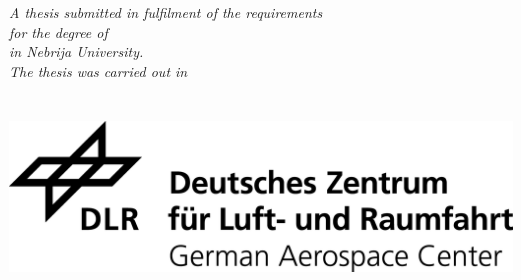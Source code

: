 \documentclass[
11pt, %
english, %
singlespacing, %
headsepline, %
]{MastersDoctoralThesis} %
\theoremstyle{definition}
\theoremstyle{remark}
\theoremstyle{theorem}
\theoremstyle{corollary}
\begin{document}
\begin{titlepage}
\begin{center}
\vfill

\large \textit{A thesis submitted in fulfilment of the requirements \\ for the degree of \degreename \\ in Nebrija University.}\\[0.3cm] %
\textit{The thesis was carried out in}\\[0.4cm]
\groupname\\\deptname\\[1cm] %
\vfill
\includegraphics[scale=0.65]{logos/DLR_Logo_EN_schwarz.png} %

\vfill
\end{center}
\end{titlepage}

\end{document}
